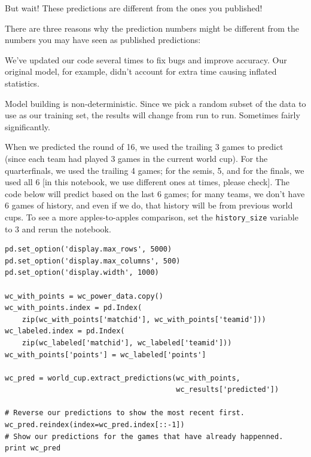 \documentclass[12pt,fleqn]{article}\usepackage{common}
\begin{document}
But wait! These predictions are different from the ones you published!

There are three reasons why the prediction numbers might be different from
the numbers you may have seen as published predictions:

We've updated our code several times to fix bugs and improve accuracy. Our
original model, for example, didn't account for extra time causing inflated
statistics.

Model building is non-deterministic. Since we pick a random subset of the
data to use as our training set, the results will change from run to
run. Sometimes fairly significantly.

When we predicted the round of 16, we used the trailing 3 games to predict
(since each team had played 3 games in the current world cup). For the
quarterfinals, we used the trailing 4 games; for the semis, 5, and for the
finals, we used all 6 [in this notebook, we use different ones at times,
please check]. The code below will predict based on the last 6 games; for
many teams, we don't have 6 games of history, and even if we do, that
history will be from previous world cups. To see a more apples-to-apples
comparison, set the \verb!history_size!  variable to 3 and rerun the
notebook.

\begin{verbatim}
pd.set_option('display.max_rows', 5000)
pd.set_option('display.max_columns', 500)
pd.set_option('display.width', 1000)

wc_with_points = wc_power_data.copy()
wc_with_points.index = pd.Index(
    zip(wc_with_points['matchid'], wc_with_points['teamid']))
wc_labeled.index = pd.Index(
    zip(wc_labeled['matchid'], wc_labeled['teamid']))
wc_with_points['points'] = wc_labeled['points']

wc_pred = world_cup.extract_predictions(wc_with_points, 
                                        wc_results['predicted'])

# Reverse our predictions to show the most recent first.
wc_pred.reindex(index=wc_pred.index[::-1])
# Show our predictions for the games that have already happenned.
print wc_pred
\end{verbatim}
\end{document}
